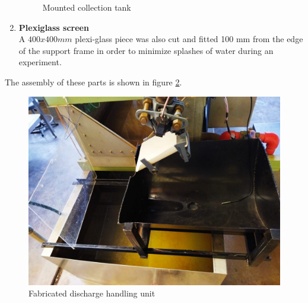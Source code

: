 \begin{enumerate}
\begin{figure}[H]
    \caption{Mounted collection tank}
    \label{fig:collection tank mounted}
\end{figure}
        \item \textbf{Plexiglass screen}\\
         A $400x400 mm$ plexi-glass piece was also cut and fitted 100 mm from the edge of the support frame in order to minimize splashes of water during an experiment.
        
\end{enumerate}  

The assembly of these parts is shown in figure \ref{fig:discharge handling unit}.
\begin{figure}[H]
 \centering
 \includegraphics[width=.8\textwidth]{Figures/dsch_fabricated.jpeg}
 \caption{Fabricated discharge handling unit}
 \label{fig:discharge handling unit}
\end{figure}


